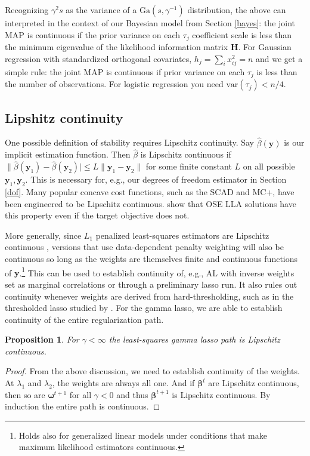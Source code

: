 \documentclass[12pt]{article}
\newtheorem{prop}{\sc Proposition}[section]
\newcommand{\bs}[1]{\boldsymbol{#1}}
\newcommand{\mr}[1]{\mathrm{#1}}
\newcommand{\bm}[1]{\mathbf{#1}}
\begin{document}
Recognizing $\gamma^2 s$ as the variance of a $\mr{Ga}(s,\gamma^{-1})$
distribution, the above can  interpreted in the context of our Bayesian model
from Section \ref{bayes}:  the joint MAP is continuous  if the prior variance
on each $\tau_j$ coefficient scale is less than the minimum eigenvalue of the
likelihood information matrix $\bm{H}$. For Gaussian regression with
standardized orthogonal covariates, $h_j = \sum_i x_{ij}^2 = n$ and we get a
simple rule: the joint MAP is continuous  if prior variance on each $\tau_j$  is
less than the number of observations.  For logistic regression you need
$\mr{var}(\tau_j) < n/4$.


\subsection{Lipshitz continuity}

One possible definition of stability requires Lipschitz continuity. Say
$\hat\beta(\bm{y})$ is our implicit estimation function. Then $\hat\beta$ is
Lipschitz continuous if  $ \|\hat\beta(\bm{y}_1)-\hat\beta(\bm{y}_2)| \leq
L\|\bm{y}_1-\bm{y}_2\| $ for some finite constant $L$ on all possible
$\bm{y}_1,\bm{y}_2$. This is necessary for, e.g., our degrees of freedom
estimator in Section \ref{dof}.  Many popular concave cost functions, such as
the SCAD and MC+, have been engineered to be Lipschitz continuous.
\cite{zou_one-step_2008} show that OSE LLA solutions have this property even
if the target objective does not.

More generally, since $L_1$ penalized least-squares estimators are Lipschitz continuous \cite[][]{zou_degrees_2007}, versions that use data-dependent penalty weighting will also be continuous so long as the weights are themselves finite and continuous functions of $\bm{y}$.\footnote{Holds also for generalized linear models under conditions that make maximum likelihood estimators continuous.}  This can be used to establish continuity of, e.g., AL with inverse weights set as marginal correlations or through a preliminary lasso run.  It also rules out continuity whenever weights are derived from hard-thresholding, such as in the thresholded lasso studied by \cite{van_de_geer_adaptive_2011}.
For the gamma lasso, we are able to establish continuity of the entire regularization path.

\begin{prop} For $\gamma<\infty$ the least-squares gamma lasso path is Lipschitz continuous. \end{prop} 
\begin{proof}
From the above discussion, we need to establish continuity of the weights.  At $\lambda_1$ and $\lambda_2$, the weights are always all one.  And if $\bs{\beta}^{t}$ are Lipschitz continuous,  then so are $\bs{\omega}^{t+1}$ for all $\gamma<0$ and thus $\bs{\beta}^{t+1}$ is Lipschitz continuous.  By induction the entire path is continuous.
\end{proof}
\end{document}
